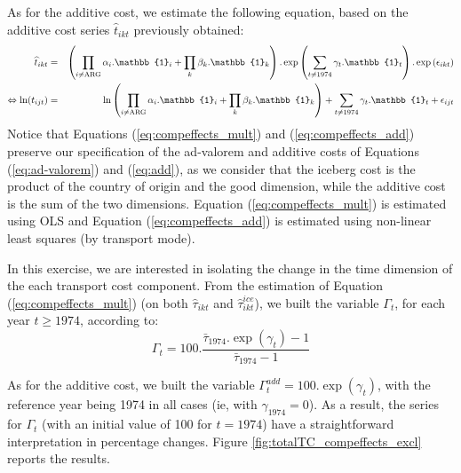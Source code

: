 \documentclass[a4paper,11pt]{article}
\begin{document}
As for the additive cost, we estimate the following equation, based on the additive cost series $\widehat{t}_{ikt}$ previously obtained:
\begin{eqnarray}
\widehat{t}_{ikt}&=&\left( \prod_{i \neq \text{ARG}}  \alpha_i.\mathbb{1}_i+\prod_{k}\beta_k.\mathbb{1}_k\right).\exp\left(\sum_{t \neq 1974}\gamma_t.\mathbb{1}_t\right) .\exp\left(\epsilon_{ikt}\right) \notag \\
\Leftrightarrow \ln(t_{ijt})&=&\ln\left( \prod_{i \neq \text{ARG}}  \alpha_i.\mathbb{1}_i+\prod_{k}\beta_k.\mathbb{1}_k\right) + \sum_{t \neq 1974}\gamma_t.\mathbb{1}_t+\epsilon_{ijt} \label{eq:compeffects_add}
\end{eqnarray}
Notice that Equations (\ref{eq:compeffects_mult}) and (\ref{eq:compeffects_add}) preserve our specification of the ad-valorem and additive costs of Equations (\ref{eq:ad-valorem}) and (\ref{eq:add}), as we consider that the iceberg cost is the product of the country of origin and the good dimension, while the additive cost is the sum of the two dimensions.
Equation (\ref{eq:compeffects_mult}) is estimated using OLS and Equation (\ref{eq:compeffects_add}) is estimated using non-linear least squares (by transport mode).

In this exercise, we are interested in isolating the change in the time dimension of the each transport cost component. From the estimation of Equation (\ref{eq:compeffects_mult}) (on both $\widehat{\tau}_{ikt}$ and $\widehat{\tau}_{ikt}^{ice}$), we built the variable $\Gamma_t$, for each year $t\geq 1974$, according to:
\begin{equation*}
\Gamma_t = 100.\frac {\bar{\tau}_{1974}.\exp(\gamma_t)-1} {\bar{\tau}_{1974}-1}
\end{equation*}

As for the additive cost, we built the variable $\Gamma^{add}_t = 100.\exp(\gamma_t)$, with the reference year being 1974 in all cases (ie, with $\gamma_{1974}=0$). As a result, the series for $\Gamma_t$ (with an initial value of 100 for $t=1974$) have a straightforward interpretation in percentage changes. Figure \ref{fig:totalTC_compeffects_excl} reports the results. 
\end{document}
